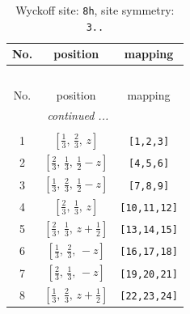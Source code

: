\documentclass[fleqn,8pt]{jsarticle}
\begin{document}
\begin{longtable}{ccc}
\caption{Wyckoff site: {\tt 8h}, site symmetry: {\tt 3..}}
 \\
 \hline \hline
No. & position & mapping \\ \hline \endfirsthead

\multicolumn{2}{l}{\tablename\ \thetable{}} \\
 \hline \hline
No. & position & mapping \\ \hline \endhead

 \hline \hline
\multicolumn{2}{r}{\footnotesize\it continued ...} \\ \endfoot

 \hline \hline
\multicolumn{2}{r}{} \\ \endlastfoot

1 & $\left[ \frac{1}{3},\, \frac{2}{3},\, z \right]$ & {\tt [1,2,3]} \\ \hline
2 & $\left[ \frac{2}{3},\, \frac{1}{3},\, \frac{1}{2} - z \right]$ & {\tt [4,5,6]} \\ \hline
3 & $\left[ \frac{1}{3},\, \frac{2}{3},\, \frac{1}{2} - z \right]$ & {\tt [7,8,9]} \\ \hline
4 & $\left[ \frac{2}{3},\, \frac{1}{3},\, z \right]$ & {\tt [10,11,12]} \\ \hline
5 & $\left[ \frac{2}{3},\, \frac{1}{3},\, z + \frac{1}{2} \right]$ & {\tt [13,14,15]} \\ \hline
6 & $\left[ \frac{1}{3},\, \frac{2}{3},\, - z \right]$ & {\tt [16,17,18]} \\ \hline
7 & $\left[ \frac{2}{3},\, \frac{1}{3},\, - z \right]$ & {\tt [19,20,21]} \\ \hline
8 & $\left[ \frac{1}{3},\, \frac{2}{3},\, z + \frac{1}{2} \right]$ & {\tt [22,23,24]} \\
\end{longtable}
\renewcommand{\arraystretch}{1.2}
\end{document}
